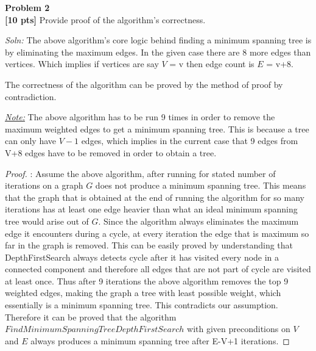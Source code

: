 \documentclass{article}
\newenvironment{problem}[2][Problem]
    { \begin{mdframed}[backgroundcolor=gray!20] \textbf{#1 #2} \\}
    {  \end{mdframed}}
\newenvironment{solution}
    {\textit{Soln:}}
    {}
\begin{document}
\begin{problem}{2}
\textbf{[10 pts]} Provide proof of the algorithm's correctness.
\end{problem}
\begin{solution}
The above algorithm's core logic behind finding a minimum spanning tree is by eliminating the maximum edges. In the given case there are 8 more edges than vertices. Which implies if vertices are say $V$ = v then edge count is $E$ = v+8.

The correctness of the algorithm can be proved by the method of proof by contradiction.

\underline{\textit{Note:}} The above algorithm has to be run 9 times in order to remove the maximum weighted edges to get a minimum spanning tree. This is because a tree can only have $V-1$ edges, which implies in the current case that 9 edges from V+8 edges have to be removed in order to obtain a tree.

\begin{proof}:
Assume the above algorithm, after running for stated number of iterations on a graph \textbf{$G$} does not produce a minimum spanning tree. This means that the graph that is obtained at the end of running the algorithm for so many iterations has at least one edge heavier than what an ideal minimum spanning tree would arise out of \textbf{$G$}.
Since the algorithm always eliminates the maximum edge it encounters during a cycle, at every iteration the edge that is maximum so far in the graph is removed. This can be easily proved by understanding that DepthFirstSearch always detects cycle after it has visited every node in a connected component and therefore all edges that are not part of cycle are visited at least once.
Thus after 9 iterations the above algorithm removes the top 9 weighted edges, making the graph a tree with least possible weight, which essentially is a minimum spanning tree.
This contradicts our assumption. Therefore it can be proved that the  algorithm $Find Minimum Spanning Tree Depth First Search$ with given preconditions on $V$ and $E$ always produces a minimum spanning tree after E-V+1 iterations.
\end{proof}
\end{solution}
\end{document}
